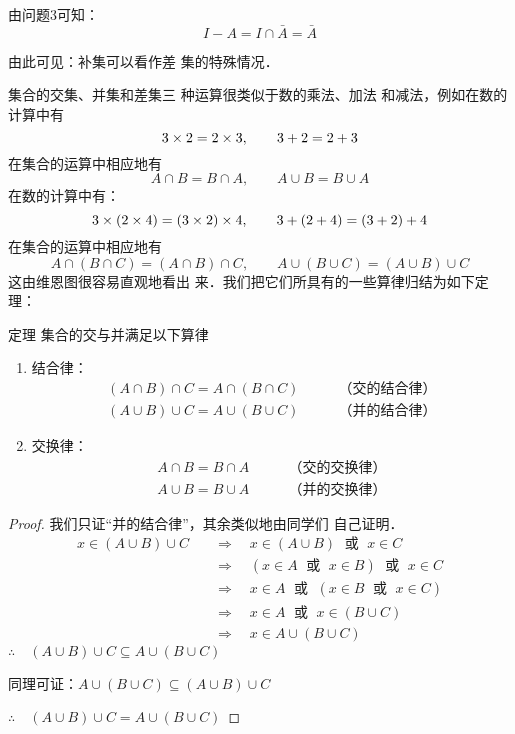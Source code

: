 由问题3可知：
\[I-A=I\cap \bar A=\bar A\]

由此可见：补集可以看作差
集的特殊情况．

\begin{figure}[htp]
    \centering
{}
    \caption{}
\end{figure}


集合的交集、并集和差集三
种运算很类似于数的乘法、加法
和减法，例如在数的计算中有
\[3\times2=2\times 3,\qquad 3+2=2+3\] 
在集合的运算中相应地有\[A\cap B=B\cap A,\qquad  A\cup B=B\cup A\]
在数的计算中有：
\[3\times(2\times4)=(3\times2)\times4,\qquad 3+(2+4)=(3+2)+4\]
在集合的运算中相应地有
\[A\cap (B\cap C)=(A\cap B)\cap C,\qquad 
A\cup (B\cup C)=(A\cup B)\cup C\]
这由维恩图很容易直观地看出
来．我们把它们所具有的一些算律归结为如下定理：

\begin{blk}
{定理} 集合的交与并满足以下算律
\begin{enumerate}
\item 结合律：
\[\begin{split}
     (A\cap B)\cap C=A\cap (B\cap C)&\qquad \text{（交的结合律）}\\
     (A\cup B)\cup C=A\cup (B\cup C)&\qquad \text{（并的结合律）}
\end{split} \]
\item 交换律：
\[\begin{split}
    A\cap B=B\cap A&\qquad \text{（交的交换律）}\\
    A\cup B=B\cup A&\qquad \text{（并的交换律）}
\end{split} \]
\end{enumerate}
\end{blk}

\begin{proof}
    我们只证“并的结合律”，其余类似地由同学们
    自己证明．
\[\begin{split}
     x\in (A\cup B)\cup C &\quad \Rightarrow \quad x\in (A\cup B)\; \text{ 或 }\;  x\in C\\
     &\quad \Rightarrow \quad  (x\in A \; \text{ 或 }\;  x\in B)\; \text{ 或 }\;  x\in C  \\
     &\quad \Rightarrow \quad   x\in A\; \text{ 或 }\;  (x\in B\; \text{ 或 }\;  x\in C) \\
     &\quad \Rightarrow \quad  x\in A\; \text{ 或 }\;  x\in (B\cup C) \\
     &\quad \Rightarrow \quad  x\in A\cup (B\cup C)  
\end{split}\]
$\therefore\quad (A\cup B)\cup C\subseteq A\cup (B\cup C)$

同理可证：$A\cup (B\cup C)\subseteq (A\cup B)\cup C$

$\therefore\quad (A\cup B)\cup C=A\cup (B\cup C)$
\end{proof}

